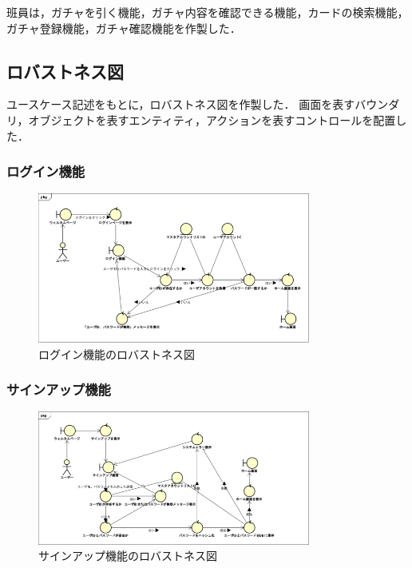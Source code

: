 \documentclass{ltjsarticle}
\begin{document}
班員は，ガチャを引く機能，ガチャ内容を確認できる機能，カードの検索機能，ガチャ登録機能，ガチャ確認機能を作製した．

\subsection{ロバストネス図}
ユースケース記述をもとに，ロバストネス図を作製した．
画面を表すバウンダリ，オブジェクトを表すエンティティ，アクションを表すコントロールを配置した．
\subsubsection{ログイン機能}
\begin{figure}[H]
    \centering
    \includegraphics[width=0.8\textwidth]{src/loginRobustness.png}
    \caption{ログイン機能のロバストネス図}
    \label{fig:robustnessLogin}
\end{figure}

\subsubsection{サインアップ機能}
\begin{figure}[H]
    \centering
    \includegraphics[width=0.8\textwidth]{src/signupRobustness.png}
    \caption{サインアップ機能のロバストネス図}
    \label{fig:robustnessSignup}
\end{figure}
\end{document}
